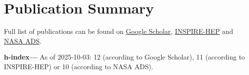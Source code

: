 \newcommand{\arxiv}[1]{[\href{http://arxiv.org/abs/#1}{arXiv:#1}]}
\def\zero{0}
\def\one{1}
\newcommand{\citeCount}[1]{%
    \def\val{#1}
    \ifx\val\zero%
    \else%
        \ifx\val\one%
        (1~citation)%
        \else%
        (#1~citations)%
        \fi%
    \fi
}


\def\apj{Astrophys.\ J.}
\def\mnras{Mon.\ Not.\ R.\ Astron.\ Soc.}
\def\prd{Phys.\ Rev.\ D}


\setcounter{numPubs}{24}
\setcounter{pubCounter}{\value{numPubs}}


\newif\ifshowpubsummary
\showpubsummarytrue
\ifshowpubsummary
\section{Publication Summary}

Full list of publications can be found on
\href{https://scholar.google.com/citations?hl=en&user=jET8KxgAAAAJ}%
{Google Scholar},
\href{https://inspirehep.net/authors/1798261}%
{INSPIRE-HEP}
and
\href{https://ui.adsabs.harvard.edu/user/libraries/SDMGXaKoRomaOJsefpo2yQ}%
{NASA ADS}.

\textbf{h-index---}%
As of 2025-10-03: 12 (according to Google Scholar),
11 (according to INSPIRE-HEP)
or 10 (according to NASA ADS).


